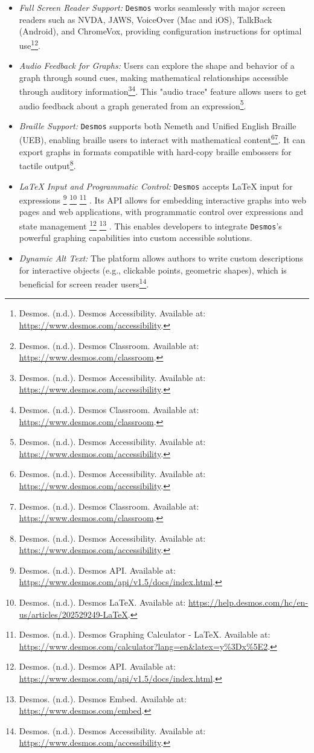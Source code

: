 \begin{itemize}
    \item \emph{Full Screen Reader Support:} \texttt{Desmos} works seamlessly with major screen readers such as NVDA, JAWS, VoiceOver (Mac and iOS), TalkBack (Android), and ChromeVox, providing configuration instructions for optimal use\footnote{Desmos. (n.d.). Desmos Accessibility. Available at: \url{https://www.desmos.com/accessibility}.}\footnote{Desmos. (n.d.). Desmos Classroom. Available at: \url{https://www.desmos.com/classroom}.}.
    \item \emph{Audio Feedback for Graphs:} Users can explore the shape and behavior of a graph through sound cues, making mathematical relationships accessible through auditory information\footnote{Desmos. (n.d.). Desmos Accessibility. Available at: \url{https://www.desmos.com/accessibility}.}\footnote{Desmos. (n.d.). Desmos Classroom. Available at: \url{https://www.desmos.com/classroom}.}. This "audio trace" feature allows users to get audio feedback about a graph generated from an expression\footnote{Desmos. (n.d.). Desmos Accessibility. Available at: \url{https://www.desmos.com/accessibility}.}.
    \item \emph{Braille Support:} \texttt{Desmos} supports both Nemeth and Unified English Braille (UEB), enabling braille users to interact with mathematical content\footnote{Desmos. (n.d.). Desmos Accessibility. Available at: \url{https://www.desmos.com/accessibility}.}\footnote{Desmos. (n.d.). Desmos Classroom. Available at: \url{https://www.desmos.com/classroom}.}. It can export graphs in formats compatible with hard-copy braille embossers for tactile output\footnote{Desmos. (n.d.). Desmos Accessibility. Available at: \url{https://www.desmos.com/accessibility}.}.
    \item \emph{LaTeX Input and Programmatic Control:} \texttt{Desmos} accepts LaTeX input for expressions
    \footnote{Desmos. (n.d.). Desmos API. Available at: \url{https://www.desmos.com/api/v1.5/docs/index.html}.}
    \footnote{Desmos. (n.d.). Desmos LaTeX. Available at: \url{https://help.desmos.com/hc/en-us/articles/202529249-LaTeX}.}
    \footnote{Desmos. (n.d.). Desmos Graphing Calculator - LaTeX. Available at: \url{https://www.desmos.com/calculator?lang=en\&latex=y\%3Dx\%5E2}.}
    . Its API allows for embedding interactive graphs into web pages and web applications, with programmatic control over expressions and state management
    \footnote{Desmos. (n.d.). Desmos API. Available at: \url{https://www.desmos.com/api/v1.5/docs/index.html}.}
    \footnote{Desmos. (n.d.). Desmos Embed. Available at: \url{https://www.desmos.com/embed}.}
    . This enables developers to integrate \texttt{Desmos}'s powerful graphing capabilities into custom accessible solutions.
    \item \emph{Dynamic Alt Text:} The platform allows authors to write custom descriptions for interactive objects (e.g., clickable points, geometric shapes), which is beneficial for screen reader users\footnote{Desmos. (n.d.). Desmos Accessibility. Available at: \url{https://www.desmos.com/accessibility}.}.
\end{itemize}
